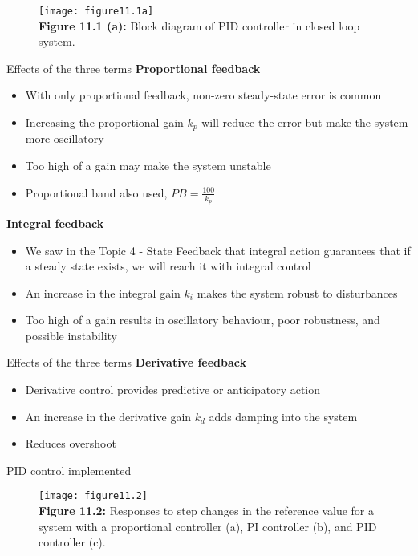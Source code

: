 \documentclass{beamer-control}
\begin{document}
\begin{frame}
\begin{figure}
	\centering
	\texttt{[image: figure11.1a]}
	\\
	\textbf{Figure 11.1 (a):} Block diagram of PID controller in closed loop system. 
\end{figure}
\end{frame}


\begin{frame}{Effects of the three terms}
\textbf{Proportional feedback}
\begin{itemize}
\item With only proportional feedback, non-zero steady-state error is common
\item Increasing the proportional gain $k_p$ will reduce the error but make the system more oscillatory
\item Too high of a gain may make the system unstable 
\item Proportional band also used, $PB=\tfrac{100}{k_p}$
\end{itemize}
\textbf{Integral feedback}
\begin{itemize}
	\item We saw in the Topic 4 - State Feedback that integral action guarantees that if a steady state exists, we will reach it with integral control
	\item An increase in the integral gain $k_i$ makes the system robust to disturbances
	\item Too high of a gain results in oscillatory behaviour, poor robustness, and possible instability
\end{itemize}
\end{frame}


\begin{frame}{Effects of the three terms}
	\textbf{Derivative feedback}
	\begin{itemize}
		\item Derivative control provides predictive or anticipatory action
		\item An increase in the derivative gain $k_d$ adds damping into the system
		\item Reduces overshoot
	\end{itemize}
\end{frame}

\begin{frame}{PID control implemented}
\begin{figure}
	\centering
	\texttt{[image: figure11.2]}
	\\
	\textbf{Figure 11.2:} Responses to step changes in the reference value for a system with a proportional controller (a), PI controller (b), and PID controller (c).
\end{figure}
\end{frame}


\SUMMARYFRAME
\FINALE
\end{document}
